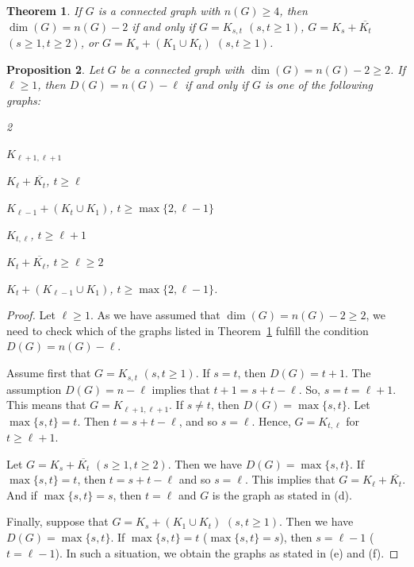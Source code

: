 \documentclass[12pt]{article}
\newtheorem{theorem}{Theorem}[section]
\newtheorem{proposition}[theorem]{Proposition}
\begin{document}
\begin{theorem} {\rm \cite[Theorem 4]{0}}
\label{t3}
If $G$ is a connected graph with $n(G) \geq 4$, then $\dim(G) = n(G) - 2$ if and only if $G= K_{s,t}$ $(s,t\geq 1)$, $G=K_s + \overline{K_t}$ $(s\geq 1, t\geq 2)$, or $G= K_s + (K_1 \cup K_t)$ $(s,t \geq 1)$. 
\end{theorem} 


\begin{proposition}\label{prop:lemn-2}
Let $G$ be a connected graph with $\dim(G) = n(G) - 2 \ge 2$. If $\ell \geq 1$, then $D(G)=n(G)-\ell$ if and only if $G$ is one of the following graphs: 
\begin{itemize}
\begin{small}
\begin{multicols}{2}
\item[(a)] 
$K_{\ell+1, \ell+1}$
\item[(c)] 
$K_{\ell}+\overline{K_t}$, $t\geq \ell$
\item[(e)] 
$K_{\ell-1}+(K_t \cup K_{1})$, $t\geq \max \{2, \ell-1\}$
\item[(b)] 
$K_{t, \ell}$, $t\geq \ell+1$
\item[(d)] 
$K_t + \overline{K_{\ell}}$, $t\geq \ell\geq 2$
\item[(f)]
$K_{t}+(K_{\ell-1}\cup K_{1})$, $t\geq \max \{2, \ell-1\}$.
\end{multicols}
\end{small}
\end{itemize}
\end{proposition}

\begin{proof}
Let $\ell \geq 1$. As we have assumed that $\dim(G) = n(G) - 2 \ge 2$, we need to check which of the graphs listed in Theorem~\ref{t3} fulfill the condition $D(G)=n(G)-\ell$. 

Assume first that $G= K_{s,t}$ $(s,t\geq 1)$. 
If $s=t$, then $D(G)=t+1$. The assumption $D(G)=n-\ell$ implies that $t+1=s+t-\ell$. So, $s=t=\ell+1$.  This means that $G= K_{\ell+1, \ell+1}$. If $s\neq t$, then $D(G)=\max \{s, t\}$. 
Let $\max \{s, t\}=t$. Then $t=s+t-\ell$, and so $s=\ell$. Hence, $G=K_{t,\ell}$ 
for $t\geq \ell+1$.  

Let $G=K_s + \overline{K_t}$ $(s\geq 1, t\geq 2)$. Then we have $D(G)=\max \{s, t\}$. If $\max \{s, t\}=t$, then $t=s+t-\ell$ and so $s=\ell$. 
This implies that $G=K_{\ell}+ \overline{K_t}$. And if $\max \{s, t\}=s$, then $t=\ell$ and $G$ is the graph as stated in (d).

Finally, suppose that $G= K_s + (K_1 \cup K_t)$ $(s,t \geq 1)$. 
Then we have $D(G)=\max \{s, t\}$. If $\max \{s, t\}=t$ ($\max \{s, t\}=s$), then $s=\ell -1$ ($t=\ell -1$). In such a situation, we obtain the graphs as stated in (e) and (f).
\end{proof}
\end{document}
